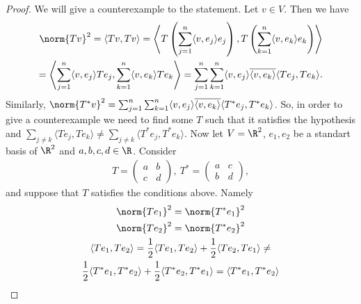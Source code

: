 \documentclass{extarticle}
\begin{document}
\begin{proof}
    We will give a counterexample to the statement. Let \( v \in V \). Then we have
    \begin{align*}
        \norm{Tv}^2 = \langle Tv, Tv \rangle =
        \left\langle
            T \left(\sum_{j=1}^{n} \langle v, e_j \rangle e_j\right),
            T \left(\sum_{k=1}^{n} \langle v, e_k \rangle e_k \right)
        \right\rangle
        \\ =
        \left\langle
            \sum_{j=1}^{n} \langle v, e_j \rangle  T e_j,
            \sum_{k=1}^{n} \langle v, e_k \rangle T e_k
        \right\rangle
        =
        \sum_{j=1}^{n}\sum_{k=1}^{n}
        \langle v, e_j \rangle  \overline {\langle v, e_k \rangle}
        \langle T e_j, T e_k \rangle.
    \end{align*}
    Similarly, \( \norm{T^* v}^2 = \sum_{j=1}^{n}\sum_{k=1}^{n}
        \langle v, e_j \rangle  \overline {\langle v, e_k \rangle}
        \langle T^* e_j, T^* e_k \rangle \).
        So, in order to give a counterexample
        we need to find some \( T \) such that
        it satisfies the hypothesis and
        \(\sum_{j \ne k} \langle T e_j, T e_k \rangle
        \ne \sum_{j \ne k} \langle T^* e_j, T^* e_k \rangle \).
    Now let \(V = \R^2\), \(e_1, e_2\) be a standart basis of \( \R^2 \) and
    \( a,  b,  c,  d \in \R \). Consider
    \begin{align*}
        T =
        \begin{pmatrix}
            a & b \\
            c & d
        \end{pmatrix}, \
        T^* =
        \begin{pmatrix}
            a & c \\
            b & d
        \end{pmatrix},
    \end{align*}
    and suppose that \( T \) satisfies the conditions above.
    Namely
    \begin{gather*}
        \norm{T e_1}^2 = \norm{T^* e_1}^2 \\
        \norm{T e_2}^2 = \norm{T^* e_2}^2 \\
        \langle T e_1, T e_2 \rangle =
        \frac{1}{2}\langle T e_1, T e_2 \rangle + \frac{1}{2}\langle T e_2, T e_1 \rangle
        \ne \\
        \frac{1}{2}\langle T^* e_1, T^* e_2 \rangle + \frac{1}{2}\langle T^* e_2, T^* e_1 \rangle =
        \langle T^* e_1, T^* e_2 \rangle
    \end{gather*}

\end{proof}
\end{document}
